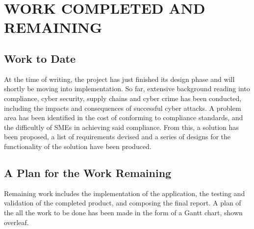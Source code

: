 \chapter{WORK COMPLETED AND REMAINING}

\section{Work to Date}
    At the time of writing, the project has just finished its design phase and will shortly be moving into implementation. So far, extensive background reading into compliance, cyber security, supply chains and cyber crime has been conducted, including the impacts and consequences of successful cyber attacks. A problem area has been identified in the cost of conforming to compliance standards, and the difficultly of SMEs in achieving said compliance. From this, a solution has been proposed, a list of requirements devised and a series of designs for the functionality of the solution have been produced.

\section{A Plan for the Work Remaining}
    Remaining work includes the implementation of the application, the testing and validation of the completed product, and composing the final report. A plan of the all the work to be done has been made in the form of a Gantt chart, shown overleaf.

